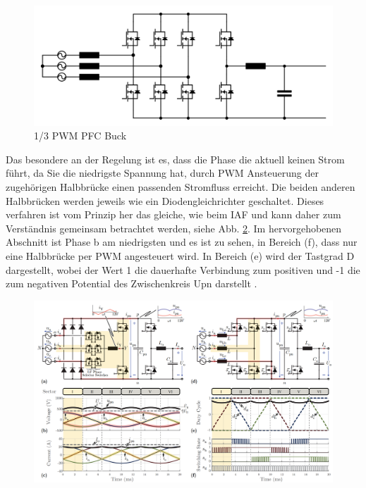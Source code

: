 	
	
	\begin{figure}
		\centering
		\includegraphics[width=0.9\linewidth]{content/Grafiken/B6_Buck}
		\caption[1/3 PWM PFC Buck]{1/3 PWM PFC Buck}
		\label{fig:b6buck}
	\end{figure}
	
	Das besondere an der Regelung ist es, dass die Phase die aktuell keinen Strom führt, da Sie die niedrigste Spannung hat, durch \gls{PWM} Ansteuerung der zugehörigen Halbbrücke einen passenden Stromfluss erreicht. Die beiden anderen Halbbrücken werden jeweils wie ein Diodengleichrichter geschaltet. Dieses verfahren ist vom Prinzip her das gleiche, wie beim \gls{IAF} und kann daher zum Verständnis gemeinsam betrachtet werden, siehe Abb. \ref{fig:b6iafsectors}.
	Im hervorgehobenen Abschnitt ist Phase b am niedrigsten und es ist zu sehen, in Bereich (f), dass nur eine Halbbrücke per \gls{PWM} angesteuert wird. In Bereich (e) wird der Tastgrad \gls{D} dargestellt, wobei der Wert 1 die dauerhafte Verbindung zum positiven und -1 die zum negativen Potential des Zwischenkreis \gls{Upn} darstellt \cite{13PWMPFC}.\\ 
	
	\begin{figure}
		\centering
		\includegraphics[width=0.9\linewidth]{content/Grafiken/B6+IAF_Sectors.png}
		\caption[Sektorenaufteilung und Schaltverhalten von IAF und B6 1/3 \cite{13PWMPFC}]{}
		\label{fig:b6iafsectors}
	\end{figure}

